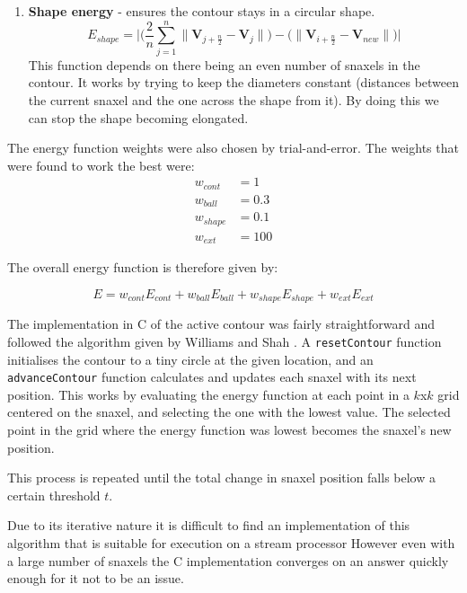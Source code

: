 \begin{enumerate}
	\item \textbf{Shape energy} - ensures the contour stays in a circular shape.
		\begin{equation}
			E_{shape} = \Bigg| \bigg( \frac{2}{n}\sum_{j=1}^n \| \mathbf{V}_{j+\frac{n}{2}} - \mathbf{V}_j \| \bigg) - \bigg( \| \mathbf{V}_{i+\frac{n}{2}} - \mathbf{V}_{new} \| \bigg) \Bigg|
		\end{equation}
		This function depends on there being an even number of snaxels in the contour.
		It works by trying to keep the diameters constant (distances between the current snaxel and the one across the shape from it).
		By doing this we can stop the shape becoming elongated.

\end{enumerate}

\noindent The energy function weights were also chosen by trial-and-error.
The weights that were found to work the best were:
\begin{align*}
	w_{cont} &= 1 \\
	w_{ball} &= 0.3 \\
	w_{shape} &= 0.1 \\
	w_{ext} &= 100
\end{align*}

The overall energy function is therefore given by:

\begin{equation}
	E = w_{cont} E_{cont} + w_{ball} E_{ball} + w_{shape} E_{shape} + w_{ext} E_{ext}
\end{equation}

\bigskip
\noindent The implementation in C of the active contour was fairly straightforward and followed the algorithm given by Williams and Shah \cite{SnakeAlgorithm}.
A \texttt{resetContour} function initialises the contour to a tiny circle at the given location,
and an \texttt{advanceContour} function calculates and updates each snaxel with its next position.
This works by evaluating the energy function at each point in a $k$x$k$ grid centered on the snaxel,
and selecting the one with the lowest value.
The selected point in the grid where the energy function was lowest becomes the snaxel's new position.

This process is repeated until the total change in snaxel position falls below a certain threshold $t$.

Due to its iterative nature it is difficult to find an implementation of this algorithm that is suitable for execution on a stream processor 
However even with a large number of snaxels the C implementation converges on an answer quickly enough for it not to be an issue.

